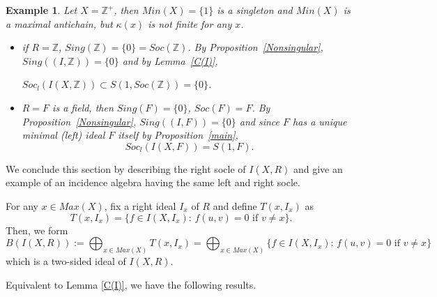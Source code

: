 \documentclass[12pt]{article}
\newtheorem{example}[theorem]{Example}
\begin{document}
\begin{example}
Let $X=\mathbb{Z}^+$, then $Min(X) = \{ 1\}$ is a singleton and $Min(X)$ is
a maximal antichain, but $\kappa(x)$ is not finite for any $x$.

\begin{itemize}
\item if $R =\mathbb{Z} $, $Sing(\mathbb{Z}) = \{ 0\} = Soc(\mathbb{Z})$. 
\newline
By Proposition~\ref{Nonsingular}, $Sing((I,\mathbb{Z})) = \{ 0\}$ and by
Lemma~\ref{C(I)}, 

$Soc_l(I(X,\mathbb{Z})) \subset S(1,Soc(\mathbb{Z})) = \{0\}$.

\item $R=F$ is a field, then $Sing(F) = \{ 0\}$, $Soc(F)=F$. \newline
By Proposition~\ref{Nonsingular}, $Sing((I,F)) = \{ 0\}$ and since $F$ has a unique minimal (left) ideal $F$ itself by Proposition~\ref{main}, 
\begin{equation*}
Soc_l(I(X,F)) = S(1,F).
\end{equation*}
\end{itemize}
\end{example}


\bigskip

We conclude this section by describing the right socle of ${I(X,R)}$ and give an example of an incidence algebra having the same left and right socle. 

For any $x \in Max(X)$, fix a right ideal $I_x$ of $R$ and define $%
T(x,I_x)$ as 
\begin{equation*}
T(x,I_x) = \{f \in I(X,I_x) : \, f(u,v) = 0 \mbox{ if } v \neq x \}.
\end{equation*}
Then, we form 
\begin{equation*}
B({I(X,R)}) := \bigoplus_{x \in Max(X)}T(x,I_x) = \bigoplus_{x \in Max(X)}
\{f \in I(X,I_x) : \, f(u,v) = 0 \mbox{ if } v \neq x \}
\end{equation*}
which is a two-sided ideal of ${I(X,R)}$.

Equivalent to Lemma \ref{C(I)}, we have the following results.
\end{document}
